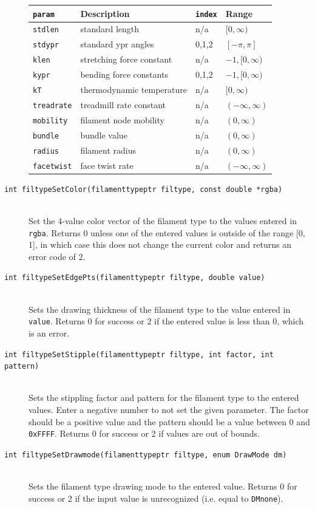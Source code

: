 \documentclass {scrbook}
\newcommand {\ttt} {\texttt}
\begin{document}
\begin{description}
\begin{longtable}[c]{llll}
\ttt{param} & Description & \ttt{index} & Range\\
\hline
\ttt{stdlen} & standard length & n/a & $[0,\infty)$\\
\ttt{stdypr} & standard ypr angles & 0,1,2 & $[-\pi,\pi]$\\
\ttt{klen} & stretching force constant & n/a & $-1,[0,\infty)$\\
\ttt{kypr} & bending force constants & 0,1,2 & $-1,[0,\infty)$\\
\ttt{kT} & thermodynamic temperature & n/a & $[0,\infty)$\\
\ttt{treadrate} & treadmill rate constant & n/a & $(-\infty,\infty)$\\
\ttt{mobility} & filament node mobility & n/a & $(0,\infty)$\\
\ttt{bundle} & bundle value & n/a & $(0,\infty)$\\
\ttt{radius} & filament radius & n/a & $(0,\infty)$\\
\ttt{facetwist} & face twist rate & n/a & $(-\infty,\infty)$
\end{longtable}

\item[\ttt{int filtypeSetColor(filamenttypeptr filtype, const double *rgba)}]
\hfill \\
Set the 4-value color vector of the filament type to the values entered in \ttt{rgba}. Returns 0 unless one of the entered values is outside of the range [0, 1], in which case this does not change the current color and returns an error code of 2.

\item[\ttt{int filtypeSetEdgePts(filamenttypeptr filtype, double value)}]
\hfill \\
Sets the drawing thickness of the filament type to the value entered in \ttt{value}. Returns 0 for success or 2 if the entered value is less than 0, which is an error.

\item[\ttt{int filtypeSetStipple(filamenttypeptr filtype, int factor, int pattern)}]
\hfill \\
Sets the stippling factor and pattern for the filament type to the entered values. Enter a negative number to not set the given parameter. The factor should be a positive value and the pattern should be a value between 0 and \ttt{0xFFFF}. Returns 0 for success or 2 if values are out of bounds.

\item[\ttt{int filtypeSetDrawmode(filamenttypeptr filtype, enum DrawMode dm)}]
\hfill \\
Sets the filament type drawing mode to the entered value. Returns 0 for success or 2 if the input value is unrecognized (i.e. equal to \ttt{DMnone}).


\end{description}
\end{document}
